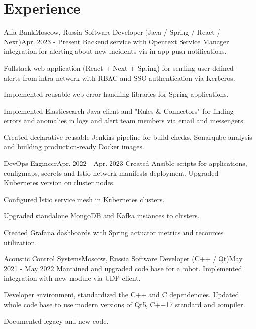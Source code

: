 

\section{Experience}\label{sec:experience}
\resumeSubHeadingListStart

\resumeSubheading
{Alfa-Bank}{Moscow, Russia}
    {Software Developer (Java / Spring / React / Next)}{Apr. 2023 - Present}
    \resumeItemListStart
        {Backend service with Opentext Service Manager integration for alerting about new Incidents via in-app push notifications.}

        {Fullstack web application (React + Next + Spring) for sending user-defined alerts from intra-network with RBAC and SSO authentication via Kerberos.}

        {Implemented reusable web error handling libraries for Spring applications.}

        {Implemented Elasticsearch Java client and "Rules \& Connectors" for finding errors and anomalies in logs and alert team members via email and messengers.}

        {Created declarative reusable Jenkins pipeline for build checks, Sonarqube analysis and building production-ready Docker images.}
    \resumeItemListEnd

\resumeSubSubheading
{DevOps Engineer}{Apr. 2022 - Apr. 2023}
    \resumeItemListStart
        {Created Ansible scripts for applications, configmaps, secrets and Istio network manifests deployment. Upgraded Kubernetes version on cluster nodes.}

        {Configured Istio service mesh in Kubernetes clusters.}

        {Upgraded standalone MongoDB and Kafka instances to clusters.}

        {Created Grafana dashboards with Spring actuator metrics and recources utilization.}
    \resumeItemListEnd

\resumeSubheading
{Acoustic Control Systems}{Moscow, Russia}
    {Software Developer (C++ / Qt)}{May 2021 - May 2022}
    \resumeItemListStart
        {Mantained and upgraded code base for a robot. Implemented integration with new module via UDP client.}

        {Developer environment, standardized the C++ and C dependencies. Updated whole code base to use modern versions of Qt5, C++17 standard and compiler.}

        {Documented legacy and new code.}
    \resumeItemListEnd
\resumeSubHeadingListEnd